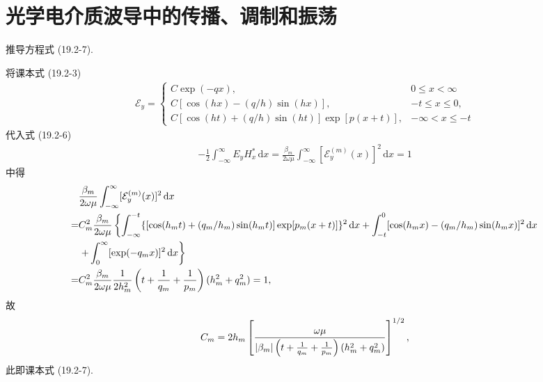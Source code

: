 \documentclass{note}
\begin{document}
\fi
\setcounter{chapter}{18}
\chapter{光学电介质波导中的传播、调制和振荡}
\begin{exe}
    推导方程式 (19.2-7).
\end{exe}
\begin{pf}
    将课本式 (19.2-3)
    \begin{align}
        \mathcal{E}_y=\left\{\begin{array}{ll}
            C\exp(-qx),&0\leq x<\infty\\
            C[\cos(hx)-(q/h)\sin(hx)],&-t\leq x\leq 0,\\
            C[\cos(ht)+(q/h)\sin(ht)]\exp[p(x+t)],&-\infty<x\leq-t
        \end{array}\right.
    \end{align}
    代入式 (19.2-6)
    \begin{align}
        -\frac{1}{2}\int_{-\infty}^{\infty}E_yH_x^*\,\mathrm{d}x=\frac{\beta_m}{2\omega\mu}\int_{-\infty}^{\infty}[\mathcal{E}_y^{(m)}(x)]^2\,\mathrm{d}x=1
    \end{align}
    中得
    \begin{align}
        \notag&\frac{\beta_m}{2\omega\mu}\int_{-\infty}^{\infty}[\mathcal{E}_y^{(m)}(x)]^2\,\mathrm{d}x\\
        \notag=&C_m^2\frac{\beta_m}{2\omega\mu}\left\{\int_{-\infty}^{-t}\{[\cos(h_mt)+(q_m/h_m)\sin(h_mt)]\exp[p_m(x+t)]\}^2\,\mathrm{d}x+\int_{-t}^0[\cos(h_mx)-(q_m/h_m)\sin(h_mx)]^2\,\mathrm{d}x\right.\\
        \notag&\left.+\int_0^{\infty}[\exp(-q_mx)]^2\,\mathrm{d}x\right\}\\
        \notag=&C_m^2\frac{\beta_m}{2\omega\mu}\frac{1}{2h_m^2}\left(t+\frac{1}{q_m}+\frac{1}{p_m}\right)(h_m^2+q_m^2)=1,
    \end{align}
    故
    \begin{align}
        C_m=2h_m\left[\frac{\omega\mu}{\left\lvert\beta_m\right\rvert\left(t+\frac{1}{q_m}+\frac{1}{p_m}\right)(h_m^2+q_m^2)}\right]^{1/2},
    \end{align}
    此即课本式 (19.2-7).
\end{pf}
\end{document}
